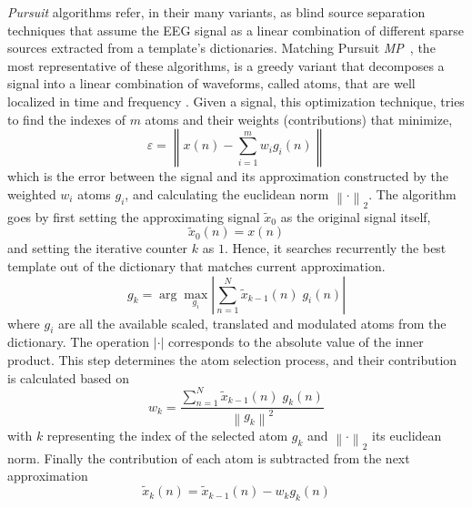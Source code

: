 \documentclass[brainsci,article,accept,moreauthors,pdftex,10pt,a4paper]{mdpi}
\begin{document}
\textit{Pursuit} algorithms refer, in their many variants, as blind source separation \citep{Vincent2010} techniques that assume the EEG signal as a linear combination of different sparse sources extracted from a template's dictionaries.  Matching Pursuit \textit{MP}~\citep{Mallat1993}, the most representative of these algorithms, is a greedy variant that decomposes a signal into a linear combination of waveforms, called atoms, that are well localized in time and frequency \citep{ChandranKS2016}.  Given a signal, this optimization technique, tries to find the indexes of $m$ atoms and their weights (contributions) that minimize,
\begin{equation}
\varepsilon =  \left\lVert   x(n) - \sum_{i=1}^{m} w_i g_{i}(n)   \right\rVert
\label{eq:mperror}
\end{equation}
which is the error between the signal and its approximation constructed by the weighted $w_i$ atoms $g_{i}$, and calculating the euclidean norm ${\left\lVert \cdot \right\rVert}_{2}$.  The algorithm goes by first setting the approximating signal $\tilde{x}_{0}$  as the original signal itself,  
\begin{equation}
\tilde{x}_{0}(n) = x(n)
\label{eq:mp2}
\end{equation}
and setting the iterative counter $k$ as $1$. Hence, it searches recurrently the best template out of the dictionary  that matches current approximation.  
\begin{equation}
g_{k} = \arg \max_{g_{i}} \left\lvert  \sum_{n=1}^{N} \tilde{x}_{k-1}(n) \; g_{i}(n) \right\rvert 
\label{eq:mp3}
\end{equation}
 where $g_{i}$ are all the available scaled, translated and modulated atoms from the dictionary.  The operation $\left\lvert \cdot \right\rvert$ corresponds to the absolute value of the inner product.  This step determines the atom selection process, and their contribution is calculated based on 
\begin{equation}
w_{k} =  \frac{\sum_{n=1}^{N} \tilde{x}_{k-1}(n) \; g_{k}(n)}{  {\left\lVert  g_{k} \right\rVert}^{2} }
\label{eq:mp4}
\end{equation}
with $k$ representing the index of the selected atom $g_{k}$ and ${\left\lVert \cdot \right\rVert}_{2}$ its euclidean norm.  Finally the contribution of each atom is subtracted from the next approximation~\citep{Cohen2014,Sanei2007, Mallat1993}
\begin{equation}
\tilde{x}_{k}(n)=  \tilde{x}_{k-1}(n) - w_{k} g_{k} (n)
\label{eq:mp5}
\end{equation}
\end{document}
